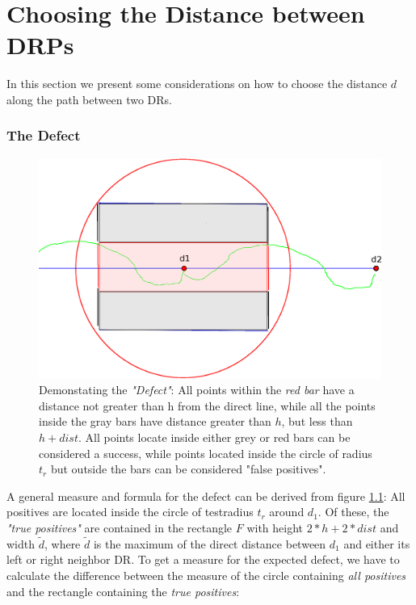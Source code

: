 \chapter{Choosing the Distance between DRPs}
\label{choosingDistance}
In this section we present some considerations on how to choose the 
distance $d$ along the path between two DRs.

\subsection{The Defect} 
\begin{figure}

\includegraphics[scale=0.5]{images/04.01.defect.eps}
\caption{Demonstating the \emph{"Defect"}: All points within the \emph{red bar} have 		
         a distance not greater than h from the direct line, while all the points
	inside the gray bars have distance greater than $h$, but less than $h+dist$.
	All points locate inside either grey or red bars can be considered a success,
	while points located inside the circle of radius $t_r$ but outside the 
	bars can be considered  "false positives".
	}
\label{generalDefectFigure}
\end{figure}
A general measure and formula for the defect can be derived from figure \ref{generalDefectFigure}:
All positives are located inside the circle of testradius $t_r$ around $d_1$.
Of these, the \emph{"true positives"} are contained in the rectangle $F$ with height $2*h+2*dist$
and width $\tilde{d}$, where $\tilde{d}$ is the maximum of the direct distance between 
$d_1$ and either its left or right neighbor DR. 
To get a measure for the expected defect, we have to calculate the difference between 
the measure of the circle containing \emph{all positives} and the rectangle containing the \emph{true positives}:

